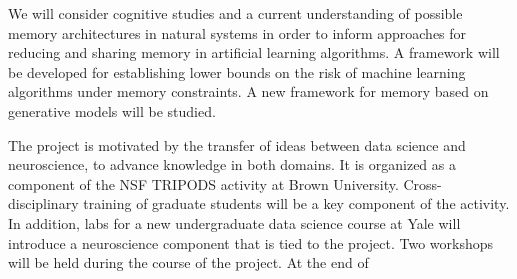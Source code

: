 We will consider cognitive studies and
a current understanding of possible memory architectures in natural systems
in order to inform approaches for reducing and sharing memory in
artificial learning algorithms. A framework will be developed for
establishing lower bounds on the risk of machine learning algorithms under
memory constraints. A new framework for memory based on generative models
will be studied.

The project is motivated by the transfer of ideas between data science and neuroscience,
to advance knowledge in both domains. It is organized as a component
of the NSF TRIPODS activity at Brown University. Cross-disciplinary
training of graduate students will be a key component of the
activity. In addition, labs for a new undergraduate data science
course at Yale will introduce a neuroscience component that is tied to
the project. Two workshops will be held during the course of the
project. At the end of 

